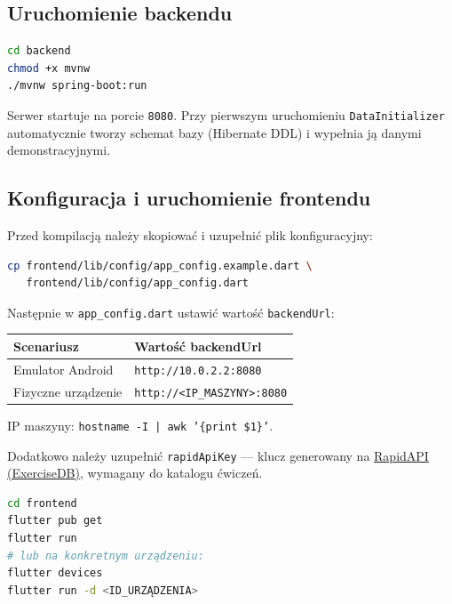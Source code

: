 \documentclass[12pt,a4paper]{article}
\begin{document}
\subsection{Uruchomienie backendu}

\begin{lstlisting}[language=bash, caption={Uruchomienie serwera Spring Boot}]
cd backend
chmod +x mvnw
./mvnw spring-boot:run
\end{lstlisting}

Serwer startuje na porcie \texttt{8080}. Przy pierwszym uruchomieniu \texttt{DataInitializer} automatycznie tworzy schemat bazy (Hibernate DDL) i wypełnia ją danymi demonstracyjnymi.

\subsection{Konfiguracja i uruchomienie frontendu}

Przed kompilacją należy skopiować i uzupełnić plik konfiguracyjny:
\begin{lstlisting}[language=bash, caption={Konfiguracja pliku app\_config.dart}]
cp frontend/lib/config/app_config.example.dart \
   frontend/lib/config/app_config.dart
\end{lstlisting}

Następnie w \texttt{app\_config.dart} ustawić wartość \texttt{backendUrl}:

\begin{center}
\begin{tabular}{ll}
  \toprule
  \textbf{Scenariusz} & \textbf{Wartość backendUrl} \\
  \midrule
  Emulator Android   & \texttt{http://10.0.2.2:8080} \\
  Fizyczne urządzenie & \texttt{http://<IP\_MASZYNY>:8080} \\
  \bottomrule
\end{tabular}
\end{center}

IP maszyny: \texttt{hostname -I | awk '\{print \$1\}'}.

Dodatkowo należy uzupełnić \texttt{rapidApiKey} --- klucz generowany na \href{https://rapidapi.com/justin-tooke/api/exercisedb}{RapidAPI (ExerciseDB)}, wymagany do katalogu ćwiczeń.

\begin{lstlisting}[language=bash, caption={Kompilacja i uruchomienie frontendu}]
cd frontend
flutter pub get
flutter run
# lub na konkretnym urządzeniu:
flutter devices
flutter run -d <ID_URZĄDZENIA>
\end{lstlisting}
\end{document}
